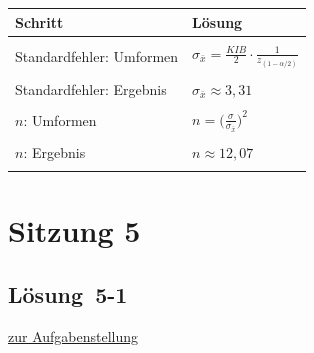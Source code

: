 \documentclass[
  11pt,
  ngerman,
  a4paper,
]{report}
\begin{document}
\begin{table}[H]
\centering
\begin{tabular}{>{\raggedright\arraybackslash}p{8cm}>{\raggedright\arraybackslash}p{8cm}}
\toprule
\textbf{Schritt} & \textbf{Lösung}\\
\midrule
\cellcolor{gray!6}{Standardfehler: Formel} & \cellcolor{gray!6}{$\frac{\mathit{KIB}}{2} = z_{(1-\alpha/2)} \cdot \sigma_{\bar{x}}$}\\
Standardfehler: Umformen & $\sigma_{\bar{x}} = \frac{\mathit{KIB}}{2} \cdot \frac{1}{z_{(1-\alpha/2)}}$\\
\cellcolor{gray!6}{Standardfehler: Einsetzen} & \cellcolor{gray!6}{$\sigma_{\bar{x}}=\frac{\mathit{KIB}}{2}\cdot \frac{1}{z_{99{,}5\%}} = 8{,}53 \cdot \frac{1}{2{,}58}$}\\
Standardfehler: Ergebnis & $\sigma_{\bar{x}} \approx 3{,}31$\\
\cellcolor{gray!6}{$n$: Formel} & \cellcolor{gray!6}{$\sigma_{\bar{x}}=\frac{\sigma}{\sqrt{n}}$}\\
$n$: Umformen & $n=\Big(\frac{\sigma}{\sigma_{\bar{x}}}\Big)^2$\\
\cellcolor{gray!6}{$n$: Einsetzen} & \cellcolor{gray!6}{$n=\Big(\frac{11{,}5}{3{,}31}\Big)^2$}\\
$n$: Ergebnis & $n\approx12{,}07$\\
\cellcolor{gray!6}{Antwortsatz} & \cellcolor{gray!6}{Es müssten 6 zusätzliche Messungen  vorgenommen werden (13 insgesamt).}\\
\bottomrule
\end{tabular}
\end{table}

\hypertarget{sitzung-5}{%
\section*{Sitzung 5}\label{sitzung-5}}

\hypertarget{loesung-5-1}{%
\subsection{Lösung~5-1}\label{loesung-5-1}}

\protect\hyperlink{aufgabe-5-1}{zur Aufgabenstellung}
\end{document}
